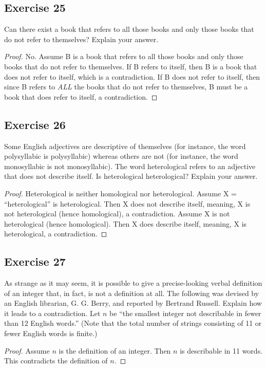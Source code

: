 \documentclass[14pt]{extarticle}
\begin{document}
\subsection{Exercise 25}
Can there exist a book that refers to all those books and only those books that do not refer to themselves? 
Explain your answer.

\begin{proof}
No. Assume B is a book that refers to all those books and only those books that do not refer to themselves. If B 
refers to itself, then B is a book that does not refer to itself, which is a contradiction. If B does not refer to
itself, then since B refers to {\it ALL} the books that do not refer to themselves, B must be a book that does refer 
to itself, a contradiction.
\end{proof}

\subsection{Exercise 26}
Some English adjectives are descriptive of themselves (for instance, the word polysyllabic is polysyllabic) whereas 
others are not (for instance, the word monosyllabic is not monosyllabic). The word heterological refers to an 
adjective that does not describe itself. Is heterological heterological? Explain your answer.

\begin{proof}
Heterological is neither homological nor heterological. Assume X = ``heterological'' is heterological. Then X does 
not describe itself, meaning, X is not heterological (hence  homological), a contradiction. Assume X is not 
heterological (hence homological). Then X does describe itself, meaning, X is heterological, a contradiction.
\end{proof}

\subsection{Exercise 27}
As strange as it may seem, it is possible to give a precise-looking verbal definition of an integer that, in 
fact, is not a definition at all. The following was devised by an English librarian, G. G. Berry, and reported by 
Bertrand Russell. Explain how it leads to a contradiction. Let $n$ be “the smallest integer not describable in fewer 
than 12 English words.” (Note that the total number of strings consisting of 11 or fewer English words is finite.)

\begin{proof}
Assume $n$ is the definition of an integer. Then $n$ is describable in 11 words. This contradicts the definition of $n$.
\end{proof}
\end{document}
